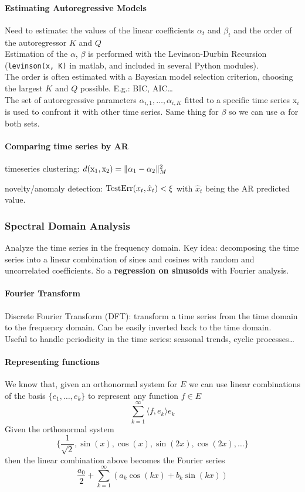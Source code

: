 \documentclass[10pt]{report}
\begin{document}
\paragraph{Estimating Autoregressive Models} Need to estimate: the values of the linear coefficients $\alpha_t$ and $\beta_t$ and the order of the autoregressor $K$ and $Q$\\
Estimation of the $\alpha$, $\beta$ is performed with the Levinson-Durbin Recursion (\texttt{levinson(x, K)} in matlab, and included in several Python modules).\\
The order is often estimated with a Bayesian model selection criterion, choosing the largest $K$ and $Q$ possible. E.g.: BIC, AIC\ldots\\
The set of autoregressive parameters $\alpha_{i,1},\ldots,\alpha_{i,K}$ fitted to a specific time series x$_i$ is used to confront it with other time series. Same thing for $\beta$ so we can use $\alpha$ for both sets.
\paragraph{Comparing time series by AR}\begin{list}{}{}
	\item timeseries clustering: $d(\hbox{x}_1,\hbox{x}_2)=\|\alpha_1-\alpha_2\|_M^2$
	\item novelty/anomaly detection: $\hbox{TestErr}(x_t,\hat{x}_t)<\xi$ with $\hat{x}_t$ being the AR predicted value.
\end{list}
\subsubsection{Spectral Domain Analysis}
Analyze the time series in the frequency domain. Key idea: decomposing the time series into a linear combination of sines and cosines with random and uncorrelated coefficients. So a \textbf{regression on sinusoids} with Fourier analysis.
\paragraph{Fourier Transform} Discrete Fourier Transform (DFT): transform a time series from the time domain to the frequency domain. Can be easily inverted back to the time domain.\\
Useful to handle periodicity in the time series: seasonal trends, cyclic processes\ldots
\paragraph{Representing functions} We know that, given an orthonormal system for $E$ we can use linear combinations of the basis $\{e_1,\ldots,e_k\}$ to represent any function $f\in E$ $$\sum_{k=1}^\infty \langle f,e_k\rangle e_k$$
Given the orthonormal system $$\{\frac{1}{\sqrt{2}}, \sin(x),\cos(x),\sin(2x),\cos(2x),\ldots\}$$
then the linear combination above becomes the Fourier series 
$$\frac{a_0}{2}+\sum_{k=1}^\infty\left(a_k\cos(kx)+b_k\sin(kx)\right)$$
\end{document}
